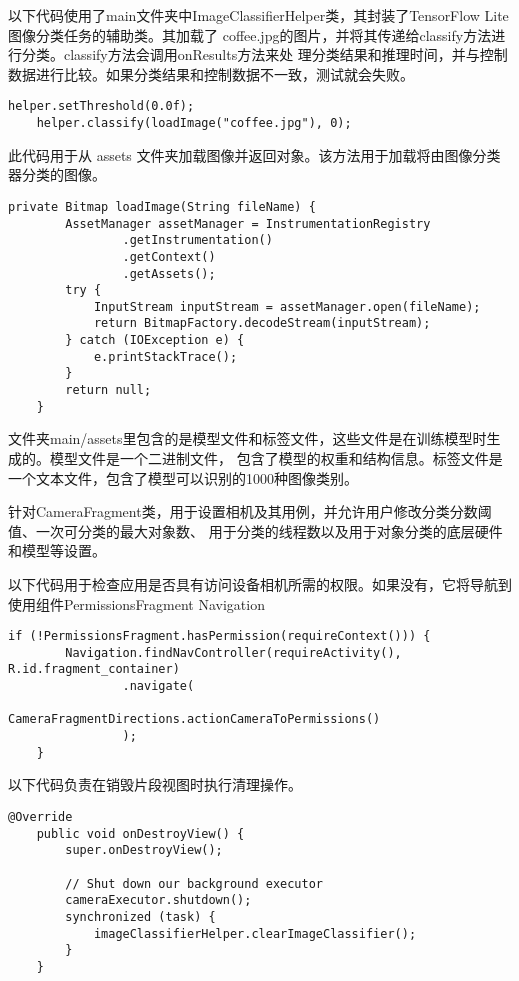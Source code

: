 以下代码使用了main文件夹中ImageClassifierHelper类，其封装了TensorFlow Lite图像分类任务的辅助类。其加载了
coffee.jpg的图片，并将其传递给classify方法进行分类。classify方法会调用onResults方法来处
理分类结果和推理时间，并与控制数据进行比较。如果分类结果和控制数据不一致，测试就会失败。
\begin{lstlisting}[style=code]
    helper.setThreshold(0.0f);
    helper.classify(loadImage("coffee.jpg"), 0);
\end{lstlisting}


此代码用于从 assets 文件夹加载图像并返回对象。该方法用于加载将由图像分类器分类的图像。
\newpage
\begin{lstlisting}[style=code]
    private Bitmap loadImage(String fileName) {
        AssetManager assetManager = InstrumentationRegistry
                .getInstrumentation()
                .getContext()
                .getAssets();
        try {
            InputStream inputStream = assetManager.open(fileName);
            return BitmapFactory.decodeStream(inputStream);
        } catch (IOException e) {
            e.printStackTrace();
        }
        return null;
    }
\end{lstlisting}

文件夹main/assets里包含的是模型文件和标签文件，这些文件是在训练模型时生成的。模型文件是一个二进制文件，
包含了模型的权重和结构信息。标签文件是一个文本文件，包含了模型可以识别的1000种图像类别。

针对CameraFragment类，用于设置相机及其用例，并允许用户修改分类分数阈值、一次可分类的最大对象数、
用于分类的线程数以及用于对象分类的底层硬件和模型等设置。

以下代码用于检查应用是否具有访问设备相机所需的权限。如果没有，它将导航到使用组件PermissionsFragment Navigation
\begin{lstlisting}[style=code]
    if (!PermissionsFragment.hasPermission(requireContext())) {
        Navigation.findNavController(requireActivity(), R.id.fragment_container)
                .navigate(
                        CameraFragmentDirections.actionCameraToPermissions()
                );
    }    
\end{lstlisting}

以下代码负责在销毁片段视图时执行清理操作。
\begin{lstlisting}[style=code]
    @Override
    public void onDestroyView() {
        super.onDestroyView();

        // Shut down our background executor
        cameraExecutor.shutdown();
        synchronized (task) {
            imageClassifierHelper.clearImageClassifier();
        }
    }
\end{lstlisting}

